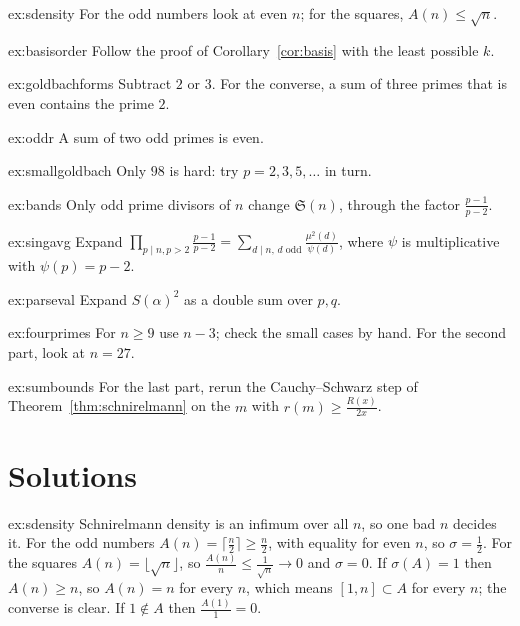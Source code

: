 \begin{hint}{ex:sdensity}
For the odd numbers look at even $n$; for the squares, $A(n)\le\sqrt n$.
\end{hint}
\begin{hint}{ex:basisorder}
Follow the proof of Corollary~\ref{cor:basis} with the least possible $k$.
\end{hint}
\begin{hint}{ex:goldbachforms}
Subtract $2$ or $3$. For the converse, a sum of three primes that is even contains the prime $2$.
\end{hint}
\begin{hint}{ex:oddr}
A sum of two odd primes is even.
\end{hint}
\begin{hint}{ex:smallgoldbach}
Only $98$ is hard: try $p=2,3,5,\dots$ in turn.
\end{hint}
\begin{hint}{ex:bands}
Only odd prime divisors of $n$ change $\mathfrak S(n)$, through the factor $\frac{p-1}{p-2}$.
\end{hint}
\begin{hint}{ex:singavg}
Expand $\prod_{p\mid n,p>2}\frac{p-1}{p-2}=\sum_{d\mid n,\,d\text{ odd}}\frac{\mu^2(d)}{\psi(d)}$, where $\psi$ is multiplicative with $\psi(p)=p-2$.
\end{hint}
\begin{hint}{ex:parseval}
Expand $S(\alpha)^2$ as a double sum over $p,q$.
\end{hint}
\begin{hint}{ex:fourprimes}
For $n\ge9$ use $n-3$; check the small cases by hand. For the second part, look at $n=27$.
\end{hint}
\begin{hint}{ex:sumbounds}
For the last part, rerun the Cauchy--Schwarz step of Theorem~\ref{thm:schnirelmann} on the $m$ with $r(m)\ge\frac{R(x)}{2x}$.
\end{hint}

\section{Solutions}

\begin{solution}{ex:sdensity}
\idea Schnirelmann density is an infimum over all $n$, so one bad $n$ decides it.
\writeup For the odd numbers $A(n)=\lceil\frac n2\rceil\ge\frac n2$, with equality for even $n$, so $\sigma=\frac12$. For the squares $A(n)=\lfloor\sqrt n\rfloor$, so
$\frac{A(n)}n\le\frac1{\sqrt n}\to0$ and $\sigma=0$. If $\sigma(A)=1$ then $A(n)\ge n$, so $A(n)=n$ for every $n$, which means $[1,n]\subset A$ for every $n$; the
converse is clear. If $1\notin A$ then $\frac{A(1)}1=0$.
\end{solution}


